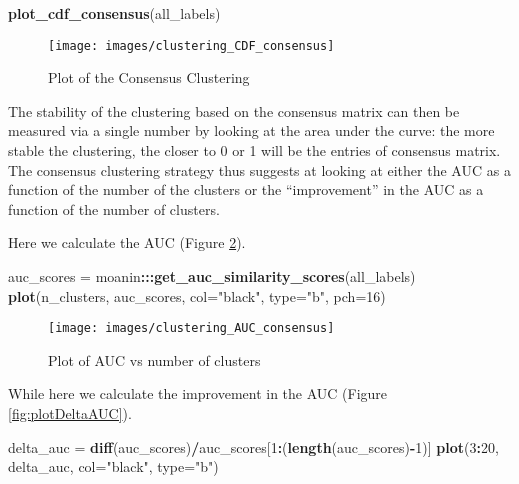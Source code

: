 \documentclass[9pt,a4paper,]{extarticle}
\newenvironment{Shaded}{\begin{snugshade}}{\end{snugshade}}
\newcommand{\DataTypeTok}[1]{\textcolor[rgb]{0.13,0.29,0.53}{#1}}
\newcommand{\DecValTok}[1]{\textcolor[rgb]{0.00,0.00,0.81}{#1}}
\newcommand{\KeywordTok}[1]{\textcolor[rgb]{0.13,0.29,0.53}{\textbf{#1}}}
\newcommand{\NormalTok}[1]{#1}
\newcommand{\OperatorTok}[1]{\textcolor[rgb]{0.81,0.36,0.00}{\textbf{#1}}}
\newcommand{\StringTok}[1]{\textcolor[rgb]{0.31,0.60,0.02}{#1}}
\begin{document}
\begin{Shaded}
\begin{Highlighting}[]
\KeywordTok{plot_cdf_consensus}\NormalTok{(all_labels)}
\end{Highlighting}
\end{Shaded}

\begin{figure}[H]

{\centering \texttt{[image: images/clustering\_CDF\_consensus]} 

}

\caption{Plot of the Consensus Clustering}\label{fig:plotCdfConsensus}
\end{figure}

The stability of the clustering based on the consensus matrix can then be
measured via a single number by looking at the area under the curve: the more
stable the clustering, the closer to 0 or 1 will be the entries of consensus
matrix. The consensus clustering strategy thus suggests at looking at either
the AUC as a function of the number of the clusters or the ``improvement'' in
the AUC as a function of the number of clusters.

Here we calculate the AUC (Figure \ref{fig:plotAUC}).

\begin{Shaded}
\begin{Highlighting}[]
\NormalTok{auc_scores =}\StringTok{ }\NormalTok{moanin}\OperatorTok{:::}\KeywordTok{get_auc_similarity_scores}\NormalTok{(all_labels)}
\KeywordTok{plot}\NormalTok{(n_clusters, auc_scores, }\DataTypeTok{col=}\StringTok{"black"}\NormalTok{, }\DataTypeTok{type=}\StringTok{"b"}\NormalTok{, }\DataTypeTok{pch=}\DecValTok{16}\NormalTok{)}
\end{Highlighting}
\end{Shaded}

\begin{figure}[H]

{\centering \texttt{[image: images/clustering\_AUC\_consensus]} 

}

\caption{Plot of AUC vs number of clusters}\label{fig:plotAUC}
\end{figure}

While here we calculate the improvement in the AUC (Figure \ref{fig:plotDeltaAUC}).

\begin{Shaded}
\begin{Highlighting}[]
\NormalTok{delta_auc =}\StringTok{ }\KeywordTok{diff}\NormalTok{(auc_scores)}\OperatorTok{/}\NormalTok{auc_scores[}\DecValTok{1}\OperatorTok{:}\NormalTok{(}\KeywordTok{length}\NormalTok{(auc_scores)}\OperatorTok{-}\DecValTok{1}\NormalTok{)]}
\KeywordTok{plot}\NormalTok{(}\DecValTok{3}\OperatorTok{:}\DecValTok{20}\NormalTok{, delta_auc, }\DataTypeTok{col=}\StringTok{"black"}\NormalTok{, }\DataTypeTok{type=}\StringTok{"b"}\NormalTok{)}
\end{Highlighting}
\end{Shaded}
\end{document}
